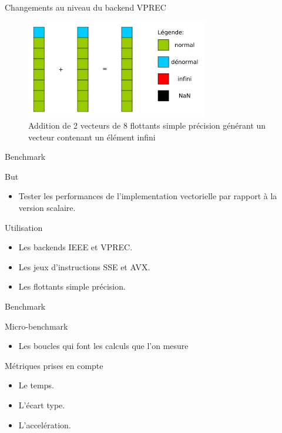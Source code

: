 \documentclass{beamer}
\begin{document}
\begin{frame}{Changements au niveau du backend VPREC}

  \begin{figure}
    \centering
    \includegraphics[width=300px]{../ressources/op_denormal}
    \caption{\label{fig:ieee_simple_precision}Addition de 2 vecteurs de 8
      flottants simple précision générant un vecteur contenant un élément infini}
  \end{figure}

\end{frame}

\begin{frame}{Benchmark}
  
  \begin{block}{But}
    \begin{itemize}
    \item Tester les performances de l'implementation vectorielle par rapport à la version scalaire. 
    \end{itemize}
  \end{block}

  \begin{block}{Utilisation}
    \begin{itemize}
    \item Les backends IEEE et VPREC.
    \item Les jeux d'instructions SSE et AVX.
    \item Les flottants simple précision.
    \end{itemize}
  \end{block}

\end{frame}

\begin{frame}{Benchmark}

  \begin{block}{Micro-benchmark}
    \begin{itemize}
    \item Les boucles qui font les calculs que l'on mesure 
    \end{itemize}
  \end{block}

  \begin{block}{Métriques prises en compte}
    \begin{itemize}
      
    \item Le temps.
    \item L'écart type.
    \item L'accelération.
      
    \end{itemize}
  \end{block}
  
\end{frame}
\end{document}
